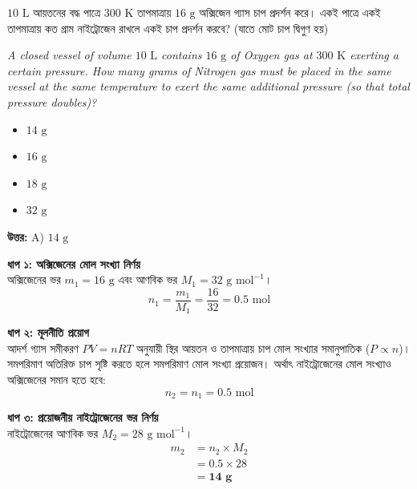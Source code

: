 \documentclass[12pt, a4paper]{article}
\begin{document}
\newpage
\begin{tcolorbox}[questionbox={প্রশ্ন (Question) 1}]
    \noindent
    $10\text{ L}$ আয়তনের বদ্ধ পাত্রে $300\text{ K}$ তাপমাত্রায় $16\text{ g}$ অক্সিজেন গ্যাস চাপ প্রদর্শন করে। একই পাত্রে একই তাপমাত্রায় কত গ্রাম নাইট্রোজেন রাখলে একই চাপ প্রদর্শন করবে? (যাতে মোট চাপ দ্বিগুণ হয়)
    
    \vspace{0.8em}
    \begin{english}
    \noindent\textit{\color{darkgray}
    A closed vessel of volume $10\text{ L}$ contains $16\text{ g}$ of Oxygen gas at $300\text{ K}$ exerting a certain pressure. How many grams of Nitrogen gas must be placed in the same vessel at the same temperature to exert the same additional pressure (so that total pressure doubles)?
    }
    \end{english}
\end{tcolorbox}

\begin{itemize}[label={}, leftmargin=1cm, itemsep=0.5em]
    \item[\textbf{A)}] $14\text{ g}$
    \item[\textbf{B)}] $16\text{ g}$
    \item[\textbf{C)}] $18\text{ g}$
    \item[\textbf{D)}] $32\text{ g}$
\end{itemize}

\vspace{0.5em}
\begin{tcolorbox}[answerbox]
    \textbf{\color{success} উত্তর:} A) $14\text{ g}$
\end{tcolorbox}
\vspace{1em}

\begin{tcolorbox}[solutionbox={সমাধান (Solution)}]
    \noindent
    \textbf{ধাপ ১: অক্সিজেনের মোল সংখ্যা নির্ণয়} \\
    অক্সিজেনের ভর $m_1 = 16\text{ g}$ এবং আণবিক ভর $M_1 = 32\text{ g mol}^{-1}$।
    \[ n_1 = \frac{m_1}{M_1} = \frac{16}{32} = 0.5\text{ mol} \]
    
    \vspace{0.4em}
    \noindent\textbf{ধাপ ২: মূলনীতি প্রয়োগ} \\
    আদর্শ গ্যাস সমীকরণ $PV = nRT$ অনুযায়ী স্থির আয়তন ও তাপমাত্রায় চাপ মোল সংখ্যার সমানুপাতিক ($P \propto n$)। সমপরিমাণ অতিরিক্ত চাপ সৃষ্টি করতে হলে সমপরিমাণ মোল সংখ্যা প্রয়োজন। অর্থাৎ নাইট্রোজেনের মোল সংখ্যাও অক্সিজেনের সমান হতে হবে:
    \[ n_2 = n_1 = 0.5\text{ mol} \]
    
    \vspace{0.4em}
    \noindent\textbf{ধাপ ৩: প্রয়োজনীয় নাইট্রোজেনের ভর নির্ণয়} \\
    নাইট্রোজেনের আণবিক ভর $M_2 = 28\text{ g mol}^{-1}$।
    \begin{align*}
        m_2 &= n_2 \times M_2 \\
        &= 0.5 \times 28 \\
        &= \mathbf{14\text{ g}}
    \end{align*}
\end{tcolorbox}
\end{document}
